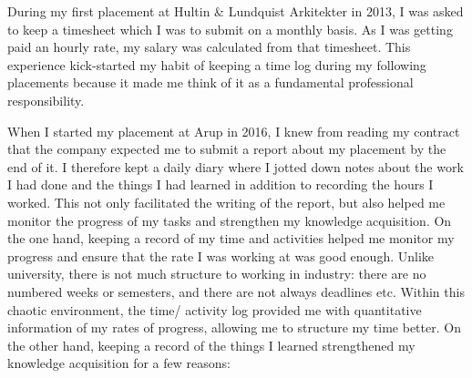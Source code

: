 During my first placement at Hultin \& Lundquist Arkitekter in 2013, I was asked to keep a timesheet which I was to submit on a monthly basis.
As I was getting paid an hourly rate, my salary was calculated from that timesheet.
This experience kick-started my habit of keeping a time log during my following placements because it made me think of it as a fundamental professional responsibility.

When I started my placement at Arup in 2016, I knew from reading my contract that the company expected me to submit a report about my placement by the end of it.
I therefore kept a daily diary where I jotted down notes about the work I had done and the things I had learned in addition to recording the hours I worked.
This not only facilitated the writing of the report, but also helped me monitor the progress of my tasks and strengthen my knowledge acquisition.
On the one hand, keeping a record of my time and activities helped me monitor my progress and ensure that the rate I was working at was good enough.
Unlike university, there is not much structure to working in industry: there are no numbered weeks or semesters, and there are not always deadlines etc.
Within this chaotic environment, the time/ activity log provided me with quantitative information of my rates of progress, allowing me to structure my time better.
On the other hand, keeping a record of the things I learned strengthened my knowledge acquisition for a few reasons:

